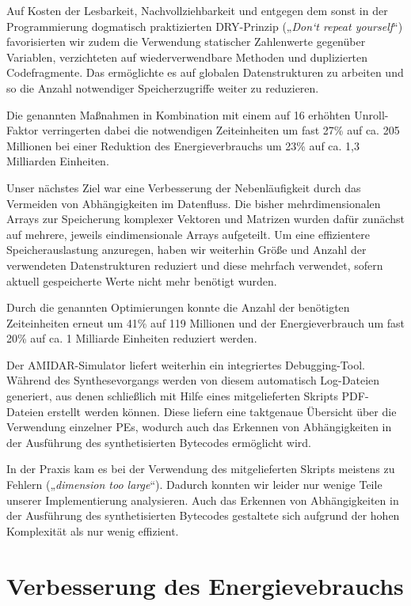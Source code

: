 \documentclass[parskip,
							 oneside,
							 11pt,
							 noheadingspace,
							 accentcolor=tud1d,
							 bigchapter,
							 colorback]{tudreport}
\begin{document}
Auf Kosten der Lesbarkeit, Nachvollziehbarkeit und entgegen dem sonst in der Programmierung dogmatisch praktizierten DRY-Prinzip („\emph{Don‘t repeat  yourself}“) favorisierten wir zudem die Verwendung statischer Zahlenwerte gegenüber Variablen, verzichteten auf wiederverwendbare Methoden und duplizierten Codefragmente. Das ermöglichte es auf globalen Datenstrukturen zu arbeiten und so die Anzahl notwendiger Speicherzugriffe weiter zu reduzieren.

Die genannten Maßnahmen in Kombination mit einem auf 16 erhöhten Unroll-Faktor verringerten dabei die notwendigen Zeiteinheiten um fast 27\% auf ca. 205 Millionen bei einer Reduktion des Energieverbrauchs um 23\% auf ca. 1,3 Milliarden Einheiten. 

Unser nächstes Ziel war eine Verbesserung der Nebenläufigkeit durch das Vermeiden von Abhängigkeiten im Datenfluss. Die bisher mehrdimensionalen Arrays zur Speicherung komplexer Vektoren und Matrizen wurden dafür zunächst auf mehrere, jeweils eindimensionale Arrays aufgeteilt. Um eine effizientere Speicherauslastung anzuregen, haben wir weiterhin Größe und Anzahl der verwendeten Datenstrukturen reduziert und diese mehrfach verwendet, sofern aktuell gespeicherte Werte nicht mehr benötigt wurden.
 
Durch die genannten Optimierungen konnte die Anzahl der benötigten Zeiteinheiten erneut um 41\% auf 119 Millionen und der Energieverbrauch um fast 20\% auf ca. 1 Milliarde Einheiten reduziert werden.

Der AMIDAR-Simulator liefert weiterhin ein integriertes Debugging-Tool. Während des Synthesevorgangs werden von diesem automatisch Log-Dateien generiert, aus denen schließlich mit Hilfe eines mitgelieferten Skripts PDF-Dateien erstellt werden können. Diese liefern eine taktgenaue Übersicht über die Verwendung einzelner PEs, wodurch auch das Erkennen von Abhängigkeiten in der Ausführung des synthetisierten Bytecodes ermöglicht wird.

In der Praxis kam es bei der Verwendung des mitgelieferten Skripts meistens zu Fehlern („\emph{dimension too large}“). Dadurch konnten wir leider nur wenige Teile unserer Implementierung analysieren. Auch das Erkennen von Abhängigkeiten in der Ausführung des synthetisierten Bytecodes gestaltete sich aufgrund der hohen Komplexität als nur wenig effizient.

\section{Verbesserung des Energievebrauchs}
\end{document}
